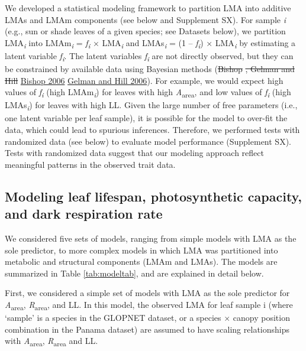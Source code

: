 \documentclass[
  12pt,
]{article}
\providecommand{\DIFaddtex}[1]{{\protect\color{blue}\uwave{#1}}} %
\providecommand{\DIFdeltex}[1]{{\protect\color{red}\sout{#1}}}                      %
\providecommand{\DIFaddbegin}{} %
\providecommand{\DIFaddend}{} %
\providecommand{\DIFdelbegin}{} %
\providecommand{\DIFdelend}{} %
\providecommand{\DIFadd}[1]{\texorpdfstring{\DIFaddtex{#1}}{#1}} %
\providecommand{\DIFdel}[1]{\texorpdfstring{\DIFdeltex{#1}}{}} %
\newcommand{\DIFscaledelfig}{0.5}
\newlength{\DIFdelgraphicswidth} %
\newlength{\DIFdelgraphicsheight} %
\newcommand{\DIFaddincludegraphics}[2][]{{\color{blue}\fbox{\DIFOincludegraphics[#1]{#2}}}} %
\newcommand{\DIFdelincludegraphics}[2][]{%
\sbox{\DIFdelgraphicsbox}{\DIFOincludegraphics[#1]{#2}}%
\settoboxwidth{\DIFdelgraphicswidth}{\DIFdelgraphicsbox} %
\settoboxtotalheight{\DIFdelgraphicsheight}{\DIFdelgraphicsbox} %
\scalebox{\DIFscaledelfig}{%
\parbox[b]{\DIFdelgraphicswidth}{\usebox{\DIFdelgraphicsbox}\\[-\baselineskip] \rule{\DIFdelgraphicswidth}{0em}}\llap{\resizebox{\DIFdelgraphicswidth}{\DIFdelgraphicsheight}{%
\setlength{\unitlength}{\DIFdelgraphicswidth}%
\begin{picture}(1,1)%
\thicklines\linethickness{2pt} %
{\color[rgb]{1,0,0}\put(0,0){\framebox(1,1){}}}%
{\color[rgb]{1,0,0}\put(0,0){\line( 1,1){1}}}%
{\color[rgb]{1,0,0}\put(0,1){\line(1,-1){1}}}%
\end{picture}%
}\hspace*{3pt}}} %
} %
\DeclareRobustCommand{\DIFaddbegin}{\DIFOaddbegin \let\includegraphics\DIFaddincludegraphics} %
\DeclareRobustCommand{\DIFaddend}{\DIFOaddend \let\includegraphics\DIFOincludegraphics} %
\DeclareRobustCommand{\DIFdelbegin}{\DIFOdelbegin \let\includegraphics\DIFdelincludegraphics} %
\DeclareRobustCommand{\DIFdelend}{\DIFOaddend \let\includegraphics\DIFOincludegraphics} %
\begin{document}
We developed a statistical modeling framework to partition LMA into additive LMAs and LMAm components (see below and Supplement SX).
For sample \emph{i} (e.g., sun or shade leaves of a given species; see Datasets below), we partition LMA\textsubscript{\emph{i}} into LMAm\textsubscript{\emph{i}} = \emph{f\textsubscript{i}} × LMA\textsubscript{\emph{i}} and LMAs\textsubscript{\emph{i}} = (1 -- \emph{f\textsubscript{i}}) × LMA\textsubscript{\emph{i}} by estimating a latent variable \emph{f\textsubscript{i}}.
The latent variables \emph{f\textsubscript{i}} are not directly observed, but they can be constrained by available data using Bayesian methods (\DIFdelbegin \DIFdel{Bishop }\DIFdelend \protect\DIFdelbegin %
\DIFdel{, Gelman and Hill }\DIFdelend \DIFaddbegin \hyperlink{ref-Bishop2006}{Bishop 2006}\DIFadd{, }\DIFaddend \protect\DIFdelbegin %
\DIFdelend \DIFaddbegin \hyperlink{ref-Gelman2006}{Gelman and Hill 2006}\DIFaddend ).
For example, we would expect high values of \emph{f\textsubscript{i}} (high LMAm\textsubscript{\emph{i}}) for leaves with high \emph{A}\textsubscript{area}, and low values of \emph{f\textsubscript{i}} (high LMAs\textsubscript{\emph{i}}) for leaves with high LL.
Given the large number of free parameters (i.e., one latent variable per leaf sample), it is possible for the model to over-fit the data, which could lead to spurious inferences.
Therefore, we performed tests with randomized data (see below) to evaluate model performance (Supplement SX).
Tests with randomized data suggest that our modeling approach reflect meaningful patterns in the observed trait data.

\hypertarget{modeling-leaf-lifespan-photosynthetic-capacity-and-dark-respiration-rate}{%
\subsection{Modeling leaf lifespan, photosynthetic capacity, and dark respiration rate}\label{modeling-leaf-lifespan-photosynthetic-capacity-and-dark-respiration-rate}}

We considered five sets of models, ranging from simple models with LMA as the sole predictor, to more complex models in which LMA was partitioned into metabolic and structural components (LMAm and LMAs).
The models are summarized in Table \ref{tab:modeltab}, and are explained in detail below.

First, we considered a simple set of models with LMA as the sole predictor for \emph{A}\textsubscript{area}, \emph{R}\textsubscript{area}, and LL.
In this model, the observed LMA for leaf sample i (where `sample' is a species in the GLOPNET dataset, or a species \(\times\) canopy position combination in the Panama dataset) are assumed to have scaling relationships with \emph{A}\textsubscript{area}, \emph{R}\textsubscript{area} and LL.
\end{document}
